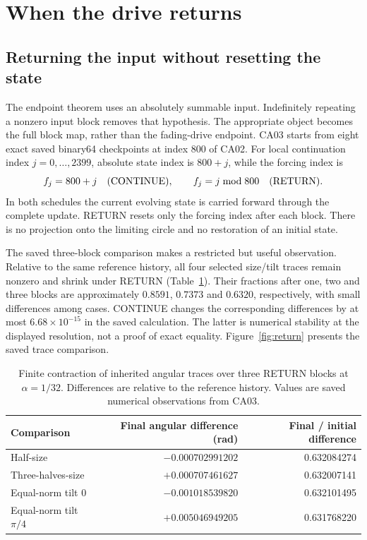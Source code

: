 \documentclass[11pt,a4paper]{article}
\numberwithin{equation}{section}
\begin{document}
\section{When the drive returns}\label{sec:return}
\subsection{Returning the input without resetting the state}
The endpoint theorem uses an absolutely summable input. Indefinitely repeating a nonzero input block removes that hypothesis. The appropriate object becomes the full block map, rather than the fading-drive endpoint. CA03 starts from eight exact saved binary64 checkpoints at index 800 of CA02. For local continuation index $j=0,\ldots,2399$, absolute state index is $800+j$, while the forcing index is
\begin{equation}\label{eq:schedules}
f_j=800+j\quad\hbox{(CONTINUE)},\qquad
f_j=j\bmod800\quad\hbox{(RETURN)}.
\end{equation}
In both schedules the current evolving state is carried forward through the complete update. RETURN resets only the forcing index after each block. There is no projection onto the limiting circle and no restoration of an initial state.

The saved three-block comparison makes a restricted but useful observation. Relative to the same reference history, all four selected size/tilt traces remain nonzero and shrink under RETURN (Table~\ref{tab:return}). Their fractions after one, two and three blocks are approximately $0.8591$, $0.7373$ and $0.6320$, respectively, with small differences among cases. CONTINUE changes the corresponding differences by at most $6.68\times10^{-15}$ in the saved calculation. The latter is numerical stability at the displayed resolution, not a proof of exact equality. Figure~\ref{fig:return} presents the saved trace comparison.

\begin{table}[htbp]
\centering\small
\caption{Finite contraction of inherited angular traces over three RETURN blocks at $\alpha=1/32$. Differences are relative to the reference history. Values are saved numerical observations from CA03.}\label{tab:return}
\begin{tabular}{lrr}
\toprule
Comparison & Final angular difference (rad) & Final / initial difference \\
\midrule
Half-size & $-0.000702991202$ & 0.632084274 \\
Three-halves-size & $+0.000707461627$ & 0.632007141 \\
Equal-norm tilt $0$ & $-0.001018539820$ & 0.632101495 \\
Equal-norm tilt $\pi/4$ & $+0.005046949205$ & 0.631768220 \\
\bottomrule
\end{tabular}
\end{table}
\end{document}
